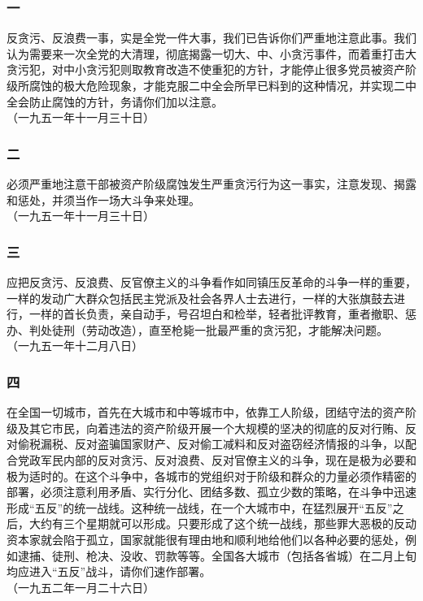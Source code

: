 \documentclass[cn,11pt,chinese]{elegantbook}
\def\myformat#1{\hfil\hfil #1}
\begin{document}
\subsubsection*{\myformat{一}}
反贪污、反浪费一事，实是全党一件大事，我们已告诉你们严重地注意此事。我们认为需要来一次全党的大清理，彻底揭露一切大、中、小贪污事件，而着重打击大贪污犯，对中小贪污犯则取教育改造不使重犯的方针，才能停止很多党员被资产阶级所腐蚀的极大危险现象，才能克服二中全会所早已料到的这种情况，并实现二中全会防止腐蚀的方针，务请你们加以注意。\\
（一九五一年十一月三十日）\\
\subsubsection*{\myformat{二}}
必须严重地注意干部被资产阶级腐蚀发生严重贪污行为这一事实，注意发现、揭露和惩处，并须当作一场大斗争来处理。\\
（一九五一年十一月三十日）\\
\subsubsection*{\myformat{三}}
应把反贪污、反浪费、反官僚主义的斗争看作如同镇压反革命的斗争一样的重要，一样的发动广大群众包括民主党派及社会各界人士去进行，一样的大张旗鼓去进行，一样的首长负责，亲自动手，号召坦白和检举，轻者批评教育，重者撤职、惩办、判处徒刑（劳动改造），直至枪毙一批最严重的贪污犯，才能解决问题。\\
（一九五一年十二月八日）\\
\subsubsection*{\myformat{四}}
在全国一切城市，首先在大城市和中等城市中，依靠工人阶级，团结守法的资产阶级及其它市民，向着违法的资产阶级开展一个大规模的坚决的彻底的反对行贿、反对偷税漏税、反对盗骗国家财产、反对偷工减料和反对盗窃经济情报的斗争，以配合党政军民内部的反对贪污、反对浪费、反对官僚主义的斗争，现在是极为必要和极为适时的。在这个斗争中，各城市的党组织对于阶级和群众的力量必须作精密的部署，必须注意利用矛盾、实行分化、团结多数、孤立少数的策略，在斗争中迅速形成“五反”的统一战线。这种统一战线，在一个大城市中，在猛烈展开“五反”之后，大约有三个星期就可以形成。只要形成了这个统一战线，那些罪大恶极的反动资本家就会陷于孤立，国家就能很有理由地和顺利地给他们以各种必要的惩处，例如逮捕、徒刑、枪决、没收、罚款等等。全国各大城市（包括各省城）在二月上旬均应进入“五反”战斗，请你们速作部署。\\
（一九五二年一月二十六日）\\
\end{document}
